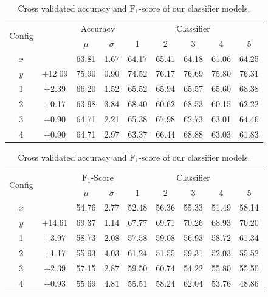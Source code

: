 \begin{table}[h]
	\begin{center}
		\begin{tabular}{c c c c c c c c c}
			\toprule
			\multirow{2}{*}{Config} &
			 &
			\multicolumn{2}{c}{Accuracy} &
			\multicolumn{5}{c}{Classifier} \\
			\cmidrule(lr){3-4}
			\cmidrule(lr){5-9}
			 & & $\mu$ & $\sigma$ & 1 & 2 & 3 & 4 & 5 \\
			\cmidrule(lr){1-9}
			$x$ &        & 63.81 & 1.67 & 64.17 & 65.41 & 64.18 & 61.06 & 64.25 \\
			$y$ & +12.09 & 75.90 & 0.90 & 74.52 & 76.17 & 76.69 & 75.80 & 76.31 \\
			\cmidrule(lr){1-9}
			1   & +2.39  & 66.20 & 1.52 & 65.52 & 65.94 & 65.57 & 65.60 & 68.38 \\
			2   & +0.17  & 63.98 & 3.84 & 68.40 & 60.62 & 68.53 & 60.15 & 62.22 \\
			3   & +0.90  & 64.71 & 2.21 & 65.38 & 67.98 & 62.73 & 63.01 & 64.46 \\
			4   & +0.90  & 64.71 & 2.97 & 63.37 & 66.44 & 68.88 & 63.03 & 61.83 \\
			\bottomrule
		\end{tabular}
		\caption{Cross validated accuracy and $\text{F}_1$-score of our classifier models.}
		\label{tab:expconvaccuracy}
	\end{center}
\end{table}

\begin{table}[h]
	\begin{center}
		\begin{tabular}{c c c c c c c c c}
			\toprule
			\multirow{2}{*}{Config} &
			 &
			\multicolumn{2}{c}{$\text{F}_1$-Score} &
			\multicolumn{5}{c}{Classifier} \\
			\cmidrule(lr){3-4}
			\cmidrule(lr){5-9}
			 & & $\mu$ & $\sigma$ & 1 & 2 & 3 & 4 & 5 \\
			\cmidrule(lr){1-9}
			$x$ &        & 54.76 & 2.77 & 52.48 & 56.36 & 55.33 & 51.49 & 58.14 \\
			$y$ & +14.61 & 69.37 & 1.14 & 67.77 & 69.71 & 70.26 & 68.93 & 70.20 \\
			\cmidrule(lr){1-9}
			1   & +3.97  & 58.73 & 2.08 & 57.58 & 59.08 & 56.93 & 58.72 & 61.34 \\
			2   & +1.17  & 55.93 & 4.03 & 61.24 & 51.55 & 59.31 & 52.03 & 55.52 \\
			3   & +2.39  & 57.15 & 2.87 & 59.50 & 60.74 & 54.22 & 55.80 & 55.50 \\
			4   & +0.93  & 55.69 & 4.81 & 55.51 & 58.24 & 62.04 & 53.76 & 48.86 \\
			\bottomrule
		\end{tabular}
		\caption{Cross validated accuracy and $\text{F}_1$-score of our classifier models.}
		\label{tab:expconvf1score}
	\end{center}
\end{table}

